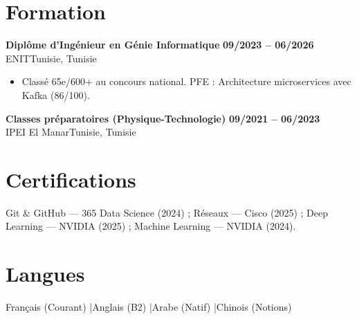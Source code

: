 \documentclass[a4paper,10pt]{article}
\newcommand{\cventry}[4]{\textbf{#1} \hfill \textbf{#4}\\[0.5pt]#2{\ifx\relax#3\relax\else, #3\fi}\par\vspace{1pt}}
\begin{document}
\section{Formation}
\cventry{Diplôme d'Ingénieur en Génie Informatique}{ENIT}{Tunisie}{09/2023 -- 06/2026}
\begin{itemize}
  \item Classé 65e/600+ au concours national. PFE : Architecture microservices avec Kafka (86/100).
\end{itemize}
\cventry{Classes préparatoires (Physique-Technologie)}{IPEI El Manar}{Tunisie}{09/2021 -- 06/2023}
\section{Certifications}
Git \& GitHub --- 365 Data Science (2024) ; Réseaux --- Cisco (2025) ; Deep Learning --- NVIDIA (2025) ; Machine Learning --- NVIDIA (2024).
\section{Langues}
Français (Courant) \quad|\quad Anglais (B2) \quad|\quad Arabe (Natif) \quad|\quad Chinois (Notions)
\end{document}
